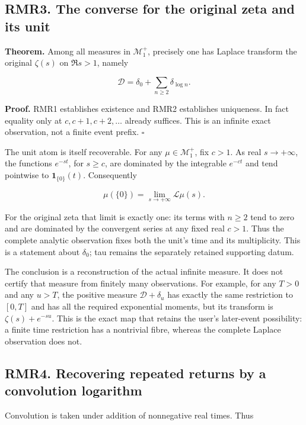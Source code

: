 \documentclass[
]{article}
\begin{document}
\subsection{RMR3. The converse for the original zeta and its
unit}\label{rmr3.-the-converse-for-the-original-zeta-and-its-unit}

\textbf{Theorem.} Among all measures in \(\mathscr M_1^+\), precisely
one has Laplace transform the original \(\zeta(s)\) on \(\Re s>1\),
namely

\[
\boxed{\mathcal D=\delta_0+\sum_{n\ge2}\delta_{\log n}.}
\tag{RMR3.1}
\]

\textbf{Proof.} RMR1 establishes existence and RMR2 establishes
uniqueness. In fact equality only at \(c,c+1,c+2,\ldots\) already
suffices. This is an infinite exact observation, not a finite event
prefix. \(\square\)

The unit atom is itself recoverable. For any \(\mu\in\mathscr M_1^+\),
fix \(c>1\). As real \(s\to+\infty\), the functions \(e^{-st}\), for
\(s\ge c\), are dominated by the integrable \(e^{-ct}\) and tend
pointwise to \(\mathbf1_{\{0\}}(t)\). Consequently

\[
\mu(\{0\})=\lim_{s\to+\infty}\mathcal L\mu(s).
\tag{RMR3.2}
\]

For the original zeta that limit is exactly one: its terms with
\(n\ge2\) tend to zero and are dominated by the convergent series at any
fixed real \(c>1\). Thus the complete analytic observation fixes both
the unit's time and its multiplicity. This is a statement about
\(\delta_0\); tau remains the separately retained supporting datum.

The conclusion is a reconstruction of the actual infinite measure. It
does not certify that measure from finitely many observations. For
example, for any \(T>0\) and any \(u>T\), the positive measure
\(\mathcal D+\delta_u\) has exactly the same restriction to \([0,T]\)
and has all the required exponential moments, but its transform is
\(\zeta(s)+e^{-su}\). This is the exact map that retains the user's
later-event possibility: a finite time restriction has a nontrivial
fibre, whereas the complete Laplace observation does not.

\subsection{RMR4. Recovering repeated returns by a convolution
logarithm}\label{rmr4.-recovering-repeated-returns-by-a-convolution-logarithm}

Convolution is taken under addition of nonnegative real times. Thus
\end{document}
